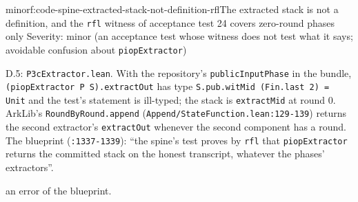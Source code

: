 \begin{finding}{minor}{f:code-spine-extracted-stack-not-definition-rfl}{The extracted stack is not a definition, and the \texttt{rfl} witness of acceptance test 24 covers zero-round phases only}
Severity: minor (an acceptance test whose witness does not test what it says; avoidable confusion about \texttt{piopExtractor})

D.5: \texttt{P3cExtractor.\allowbreak{}lean}. With the repository's \texttt{publicInputPhase} in the bundle, \texttt{(\allowbreak{}p\allowbreak{}i\allowbreak{}o\allowbreak{}p\allowbreak{}E\allowbreak{}x\allowbreak{}t\allowbreak{}r\allowbreak{}a\allowbreak{}c\allowbreak{}t\allowbreak{}o\allowbreak{}r\allowbreak{} P\allowbreak{} S\allowbreak{})\allowbreak{}.\allowbreak{}e\allowbreak{}x\allowbreak{}t\allowbreak{}r\allowbreak{}a\allowbreak{}c\allowbreak{}t\allowbreak{}O\allowbreak{}u\allowbreak{}t} has type \texttt{S\allowbreak{}.\allowbreak{}p\allowbreak{}u\allowbreak{}b\allowbreak{}.\allowbreak{}w\allowbreak{}i\allowbreak{}t\allowbreak{}M\allowbreak{}i\allowbreak{}d\allowbreak{} (\allowbreak{}F\allowbreak{}i\allowbreak{}n\allowbreak{}.\allowbreak{}l\allowbreak{}a\allowbreak{}s\allowbreak{}t\allowbreak{} 2\allowbreak{})\allowbreak{} =\allowbreak{} U\allowbreak{}n\allowbreak{}i\allowbreak{}t} and the test's statement is ill-typed; the stack is \texttt{extractMid} at round 0. ArkLib's \texttt{RoundByRound.\allowbreak{}append} (\texttt{A\allowbreak{}p\allowbreak{}p\allowbreak{}e\allowbreak{}n\allowbreak{}d\allowbreak{}/\allowbreak{}S\allowbreak{}t\allowbreak{}a\allowbreak{}t\allowbreak{}e\allowbreak{}F\allowbreak{}u\allowbreak{}n\allowbreak{}c\allowbreak{}t\allowbreak{}i\allowbreak{}o\allowbreak{}n\allowbreak{}.\allowbreak{}l\allowbreak{}e\allowbreak{}a\allowbreak{}n\allowbreak{}:\allowbreak{}1\allowbreak{}2\allowbreak{}9\allowbreak{}-{}\allowbreak{}1\allowbreak{}3\allowbreak{}9}) returns the second extractor's \texttt{extractOut} whenever the second component has a round. The blueprint (\texttt{:1337-{}1339}): \enquote{the spine's test proves by \texttt{rfl} that \texttt{piopExtractor} returns the committed stack on the honest transcript, whatever the phases' extractors}.

an error of the blueprint.


\end{finding}
